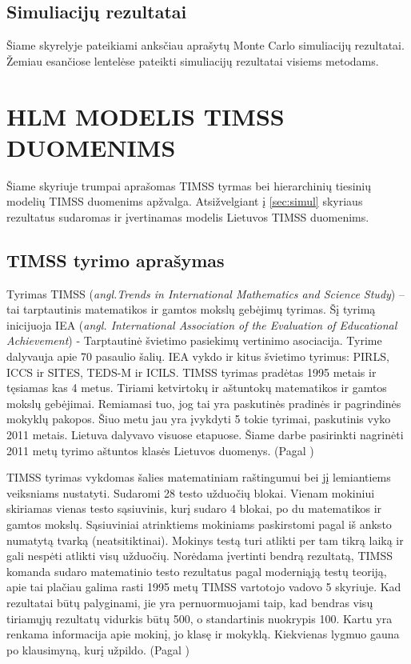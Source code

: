 \documentclass[12pt,a4paper]{article}
\begin{document}
\subsection{Simuliacijų rezultatai}
\indent Šiame skyrelyje pateikiami anksčiau aprašytų Monte Carlo simuliacijų rezultatai. Žemiau esančiose lentelėse pateikti simuliacijų rezultatai visiems metodams. 



\newpage
\section{HLM MODELIS TIMSS DUOMENIMS} \label{sec:timss}
\indent Šiame skyriuje trumpai aprašomas TIMSS tyrmas bei hierarchinių tiesinių modelių TIMSS duomenims apžvalga. Atsižvelgiant į \ref{sec:simul} skyriaus rezultatus sudaromas ir įvertinamas modelis Lietuvos TIMSS duomenims.

\subsection{TIMSS tyrimo aprašymas} \label{subsec:timss1}

\indent Tyrimas TIMSS (\textit{angl.Trends in International Mathematics and Science Study}) – tai tarptautinis matematikos ir gamtos mokslų gebėjimų tyrimas. Šį tyrimą inicijuoja IEA (\textit{angl. International Association of the Evaluation of Educational Achievement}) - Tarptautinė švietimo pasiekimų vertinimo asociacija. Tyrime dalyvauja apie 70 pasaulio šalių. IEA vykdo ir kitus švietimo tyrimus: PIRLS, ICCS ir SITES, TEDS-M ir ICILS. TIMSS tyrimas pradėtas 1995 metais ir tęsiamas kas 4 metus. Tiriami ketvirtokų ir aštuntokų matematikos ir gamtos mokslų gebėjimai. Remiamasi tuo, jog tai yra paskutinės pradinės ir pagrindinės mokyklų pakopos. Šiuo metu jau yra įvykdyti 5 tokie tyrimai, paskutinis vyko 2011 metais. Lietuva dalyvavo visuose etapuose. Šiame darbe pasirinkti nagrinėti 2011 metų tyrimo aštuntos klasės Lietuvos duomenys. (Pagal \cite{timss2011lt})

\indent TIMSS tyrimas vykdomas šalies matematiniam raštingumui bei jį lemiantiems veiksniams nustatyti. Sudaromi 28 testo užduočių blokai. Vienam mokiniui skiriamas vienas testo sąsiuvinis, kurį sudaro 4 blokai, po du matematikos ir gamtos mokslų. Sąsiuviniai atrinktiems mokiniams paskirstomi pagal iš anksto numatytą tvarką (neatsitiktinai). Mokinys testą turi atlikti per tam tikrą laiką ir gali nespėti atlikti visų užduočių. Norėdama įvertinti bendrą rezultatą, TIMSS komanda sudaro matematinio testo rezultatus pagal moderniąją testų teoriją, apie tai plačiau galima rasti 1995 metų TIMSS vartotojo vadovo \cite{timss1995} 5 skyriuje. Kad rezultatai būtų palyginami, jie yra pernuormuojami taip, kad bendras visų tiriamųjų rezultatų vidurkis būtų 500, o standartinis nuokrypis 100. Kartu yra renkama informacija apie mokinį, jo klasę ir mokyklą. Kiekvienas lygmuo gauna po klausimyną, kurį užpildo. (Pagal \cite{timss2011lt})
\end{document}
